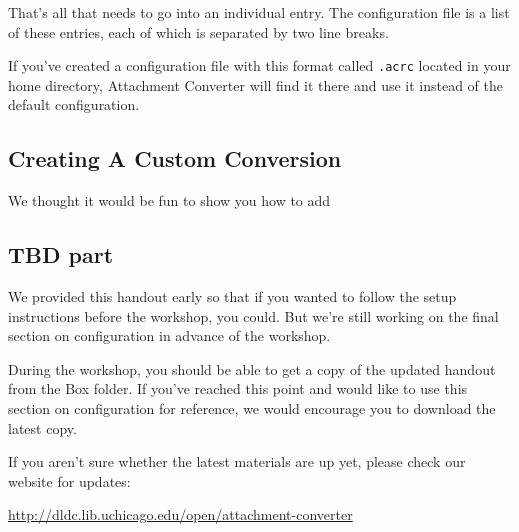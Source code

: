 \documentclass[11pt]{article}
\begin{document}
That's all that needs to go into an individual entry.  The
configuration file is a list of these entries, each of which is
separated by two line breaks.

If you've created a configuration file with this format called \texttt{.acrc}
located in your home directory, Attachment Converter will find it
there and use it instead of the default configuration.

\subsection{Creating A Custom Conversion}
\label{sec:orga4345b9}

We thought it would be fun to show you how to add 

\subsection{TBD part}
\label{sec:org7c2cd58}

We provided this handout early so that if you wanted to follow the
setup instructions before the workshop, you could.  But we're still
working on the final section on configuration in advance of the
workshop.

During the workshop, you should be able to get a copy of the updated
handout from the Box folder.  If you've reached this point and would
like to use this section on configuration for reference, we would
encourage you to download the latest copy.

If you aren't sure whether the latest materials are up yet, please
check our website for updates:

\url{http://dldc.lib.uchicago.edu/open/attachment-converter}
\end{document}
